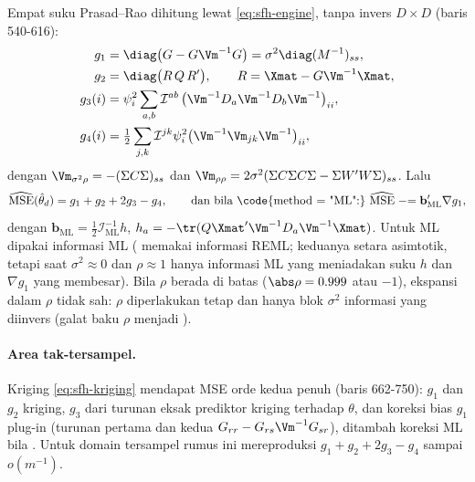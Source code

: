 Empat suku Prasad--Rao dihitung lewat \eqref{eq:sfh-engine}, tanpa invers
$D\times D$ (baris 540-616):
\begin{align}
  g_1 &= \diag\bigl(G-G\Vm^{-1}G\bigr)=\sigma^2\diag(M^{-1})_{ss},
    \label{eq:sfh-g1}\\
  g_2 &= \diag\bigl(R\,Q\,R'\bigr),\qquad R=\Xmat-G\Vm^{-1}\Xmat,
    \label{eq:sfh-g2}\\
  g_3(i) &= \psi_i^2\sum_{a,b}\mathcal I^{ab}\,
    \bigl(\Vm^{-1}D_a\Vm^{-1}D_b\Vm^{-1}\bigr)_{ii},
    \label{eq:sfh-g3}\\
  g_4(i) &= \tfrac12\sum_{j,k}\mathcal I^{jk}\psi_i^2
    \bigl(\Vm^{-1}\Vm_{jk}\Vm^{-1}\bigr)_{ii},
    \label{eq:sfh-g4}
\end{align}
dengan $\Vm_{\sigma^2\rho}=-(\Sigma C\Sigma)_{ss}$ dan
$\Vm_{\rho\rho}=2\sigma^2(\Sigma C\Sigma C\Sigma-\Sigma W'W\Sigma)_{ss}$. Lalu
\begin{equation}
  \widehat{\mathrm{MSE}}(\hat\theta_d)=g_1+g_2+2g_3-g_4,
  \qquad
  \text{dan bila \code{method = "ML":}\ }
  \widehat{\mathrm{MSE}}\mathrel{-}=\mathbf{b}_{\text{ML}}'\nabla g_1,
  \label{eq:sfh-mse}
\end{equation}
dengan $\mathbf b_{\text{ML}}=\tfrac12\mathcal I_{\text{ML}}^{-1}h$,
$h_a=-\tr(Q\Xmat'\Vm^{-1}D_a\Vm^{-1}\Xmat)$. Untuk ML dipakai informasi ML
( memakai informasi REML; keduanya setara asimtotik, tetapi saat
$\sigma^2\approx0$ dan $\rho\approx1$ hanya informasi ML yang meniadakan suku
$h$ dan $\nabla g_1$ yang membesar). Bila $\rho$ berada di batas
($\abs\rho=0.999$ atau $-1$), ekspansi dalam $\rho$ tidak sah: $\rho$
diperlakukan tetap dan hanya blok $\sigma^2$ informasi yang diinvers (galat
baku $\rho$ menjadi ).

\paragraph{Area tak-tersampel.} Kriging \eqref{eq:sfh-kriging} mendapat MSE
orde kedua penuh (baris 662-750): $g_1$ dan $g_2$ kriging, $g_3$ dari turunan
eksak prediktor kriging terhadap $\theta$, dan koreksi bias $g_1$ plug-in
(turunan pertama dan kedua $G_{rr}-G_{rs}\Vm^{-1}G_{sr}$), ditambah koreksi ML
bila . Untuk domain tersampel rumus ini mereproduksi
$g_1+g_2+2g_3-g_4$ sampai $o(m^{-1})$.

